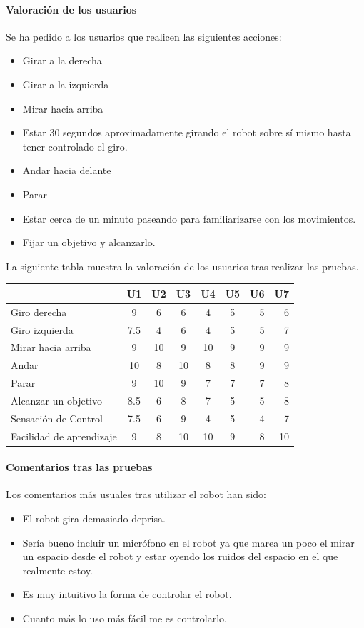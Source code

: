 \documentclass[twoside, 12pt]{epstfg}
\begin{document}
\paragraph{Valoración de los usuarios}

Se ha pedido a los usuarios que realicen las siguientes acciones:

\begin{itemize}
	\item Girar a la derecha
	\item Girar a la izquierda
	\item Mirar hacia arriba
	\item Estar 30 segundos aproximadamente girando el robot sobre sí mismo hasta tener controlado el giro.
	\item Andar hacia delante
	\item Parar
	\item Estar cerca de un minuto paseando para familiarizarse con los movimientos.
	\item Fijar un objetivo y alcanzarlo.
\end{itemize}

La siguiente tabla muestra la valoración de los usuarios tras realizar las pruebas.

\begin{tabular}{|l | c | c | c | c | c | r | r |}
	\hline
	 & U1 & U2 & U3 & U4 & U5 & U6 & U7\\
	\hline
	Giro derecha & 9 & 6 & 6 & 4 & 5 & 5 & 6\\
	Giro izquierda & 7.5 & 4 & 6 & 4 & 5 & 5 & 7\\
	Mirar hacia arriba & 9 & 10 & 9 & 10 & 9 & 9 & 9\\
	Andar & 10 & 8 & 10 & 8 & 8 & 9 & 9\\
	Parar & 9 & 10 & 9 & 7 & 7 & 7 & 8\\
	Alcanzar un objetivo & 8.5 & 6 & 8 & 7 & 5 & 5 & 8\\
	Sensación de Control & 7.5 & 6 & 9 & 4 & 5 & 4 & 7\\
	Facilidad de aprendizaje & 9 & 8 & 10 & 10 & 9 & 8 & 10\\
	\hline
\end{tabular}


\paragraph{Comentarios tras las pruebas}


Los comentarios más usuales tras utilizar el robot han sido:
\begin{itemize}
	\item El robot gira demasiado deprisa.
	\item Sería bueno incluir un micrófono en el robot ya que marea un poco el mirar un espacio desde el robot y estar oyendo los ruidos del espacio en el que realmente estoy.
	\item Es muy intuitivo la forma de controlar el robot.
	\item Cuanto más lo uso más fácil me es controlarlo.
\end{itemize}
 
\end{document}
